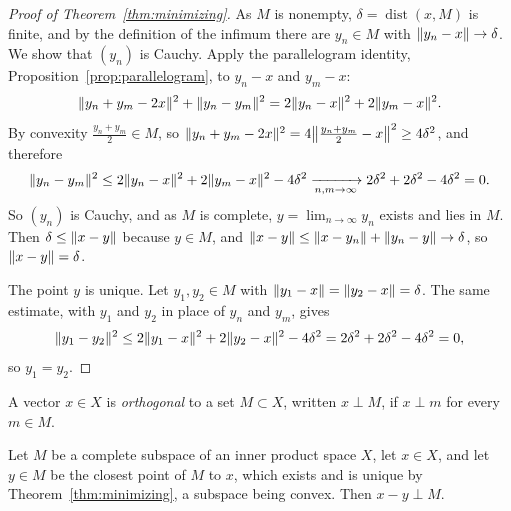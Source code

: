 \begin{proof}[Proof of Theorem~\ref{thm:minimizing}]
As $M$ is nonempty, $\delta = \operatorname{dist}(x, M)$ is finite, and by the
definition of the infimum there are $y_n \in M$ with
$\norm{y_n - x} \to \delta$. We show that $(y_n)$ is Cauchy. Apply the
parallelogram identity, Proposition~\ref{prop:parallelogram}, to $y_n - x$
and $y_m - x$:
\[
  \norm{y_n + y_m - 2x}^2 + \norm{y_n - y_m}^2
  = 2\norm{y_n - x}^2 + 2\norm{y_m - x}^2 .
\]
By convexity $\frac{y_n + y_m}{2} \in M$, so
$\norm{y_n + y_m - 2x}^2 = 4 \norm[\big]{\frac{y_n + y_m}{2} - x}^2
\ge 4\delta^2$, and therefore
\[
  \norm{y_n - y_m}^2
  \le 2\norm{y_n - x}^2 + 2\norm{y_m - x}^2 - 4\delta^2
  \xrightarrow[n, m \to \infty]{} 2\delta^2 + 2\delta^2 - 4\delta^2 = 0 .
\]
So $(y_n)$ is Cauchy, and as $M$ is complete, $y = \lim_{n \to \infty} y_n$
exists and lies in $M$. Then $\delta \le \norm{x - y}$ because $y \in M$, and
$\norm{x - y} \le \norm{x - y_n} + \norm{y_n - y} \to \delta$, so
$\norm{x - y} = \delta$.

The point $y$ is unique. Let $y_1, y_2 \in M$ with
$\norm{y_1 - x} = \norm{y_2 - x} = \delta$. The same estimate, with $y_1$ and
$y_2$ in place of $y_n$ and $y_m$, gives
\[
  \norm{y_1 - y_2}^2
  \le 2\norm{y_1 - x}^2 + 2\norm{y_2 - x}^2 - 4\delta^2
  = 2\delta^2 + 2\delta^2 - 4\delta^2 = 0 ,
\]
so $y_1 = y_2$.
\end{proof}

\begin{definition}\label{def:orth-set}
A vector $x \in X$ is \emph{orthogonal} to a set $M \subset X$, written
$x \perp M$, if $x \perp m$ for every $m \in M$.
\end{definition}

\begin{lemma}[Orthogonality]\label{lem:orthogonality}
Let $M$ be a complete subspace of an inner product space $X$, let $x \in X$,
and let $y \in M$ be the closest point of $M$ to $x$, which exists and is
unique by Theorem~\ref{thm:minimizing}, a subspace being convex. Then
$x - y \perp M$.
\end{lemma}

